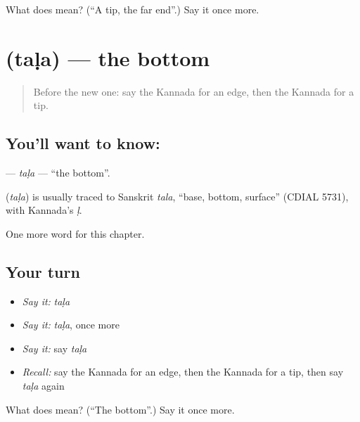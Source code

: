 \begin{tcolorbox}[breakable,colback=teal!4,colframe=teal!35!black,title={Before you move on}]
What does  mean? (\textquotedblleft{}A tip, the far end\textquotedblright{}.) Say it once more.
\end{tcolorbox}
\section[\texorpdfstring{\kn{ತಳ} (taḷa)}{ತಳ (taḷa)}]{ (taḷa) — the bottom}

\label{lesson:KA-C214-tala}



\begin{quote}
Before the new one: say the Kannada for an edge, then the Kannada for a tip.
\end{quote}

\subsection*{You'll want to know: }
\textbf{} — \emph{taḷa} — \textquotedblleft{}the bottom\textquotedblright{}.

\begin{cousinweb}
\textbf{} (\emph{taḷa}) is usually traced to Sanskrit \emph{tala}, \textquotedblleft{}base, bottom, surface\textquotedblright{} (CDIAL 5731), with Kannada's \emph{ḷ}.
\end{cousinweb}

\begin{grammarlens}[title={What you've built}]
One more word for this chapter.
\end{grammarlens}

\subsection*{Your turn}
\begin{itemize}
\raggedright
  \item \emph{Say it:} \emph{taḷa}
  \item \emph{Say it:} \emph{taḷa}, once more
  \item \emph{Say it:} say \emph{taḷa}
  \item \emph{Recall:} say the Kannada for an edge, then the Kannada for a tip, then say \emph{taḷa} again
\end{itemize}

\begin{tcolorbox}[breakable,colback=teal!4,colframe=teal!35!black,title={Before you move on}]
What does  mean? (\textquotedblleft{}The bottom\textquotedblright{}.) Say it once more.
\end{tcolorbox}
